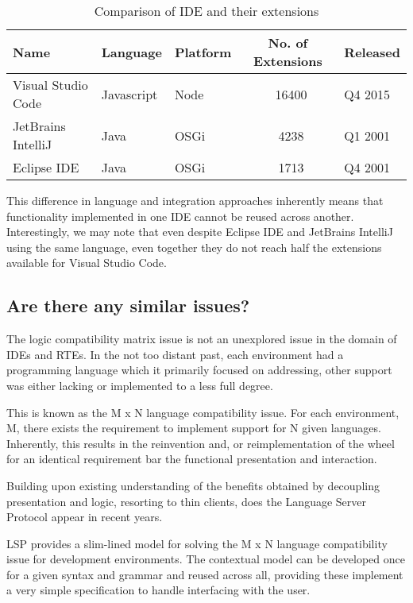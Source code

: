


\begin{table}[h!]
\centering
\begin{tabular}{|l|l|l|c|l|}
	\hline 
	\rule[-1ex]{0pt}{2.5ex} Name & Language & Platform & No. of Extensions & Released \\ 
	\hline 
	\hline 
	\rule[-1ex]{0pt}{2.5ex} Visual Studio Code & Javascript & Node & ~16400 & Q4 2015\\ 
	\hline 
	\rule[-1ex]{0pt}{2.5ex} JetBrains IntelliJ & Java & OSGi  & ~4238 & Q1 2001 \\ 
	\hline 
	\rule[-1ex]{0pt}{2.5ex} Eclipse IDE & Java & OSGi & ~1713 & Q4 2001 \\ 
	\hline 
\end{tabular} 
\caption{Comparison of IDE and their extensions}
\end{table}

This difference in language and integration approaches inherently means that functionality implemented in one IDE cannot be reused across another. Interestingly, we may note that even despite Eclipse IDE and JetBrains IntelliJ using the same language, even together they do not reach half the extensions available for Visual Studio Code.

\subsection{Are there any similar issues?}

The logic compatibility matrix issue is not an unexplored issue in the domain of IDEs and RTEs. In the not too distant past, each environment had a programming language which it primarily focused on addressing, other support was either lacking or implemented to a less full degree. 

This is known as the M x N language compatibility issue. For each environment, M, there exists the requirement to implement support for N given languages. Inherently, this results in the reinvention and, or reimplementation of the wheel for an identical requirement bar the functional presentation and interaction.

Building upon existing understanding of the benefits obtained by decoupling presentation and logic, resorting to thin clients, does the Language Server Protocol \parencite{lspGitHubSiteMSFT} appear in recent years.

LSP provides a slim-lined model for solving the M x N language compatibility issue for development environments. The contextual model can be developed once for a given syntax and grammar and reused across all, providing these implement a very simple specification to handle interfacing with the user.

